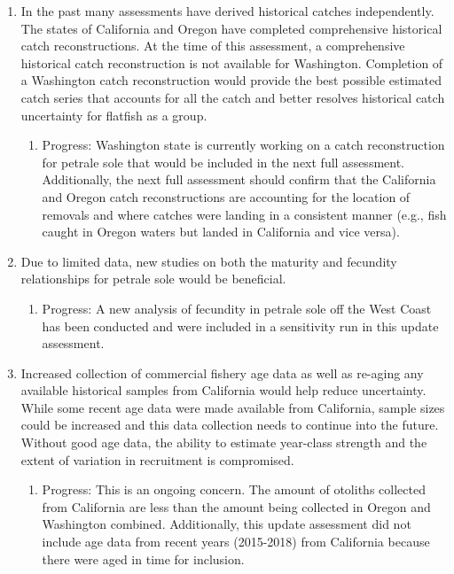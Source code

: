\documentclass[12pt,]{article}
\begin{document}
\begin{enumerate}

\item In the past many assessments have derived historical catches independently. The states of California and Oregon have completed comprehensive historical catch reconstructions. At the time of this assessment, a comprehensive historical catch reconstruction is not available for Washington. Completion of a Washington catch reconstruction would provide the best possible estimated catch series that accounts for all the catch and better resolves historical catch uncertainty for flatfish as a group.

\begin{enumerate}
\item Progress: Washington state is currently working on a catch reconstruction for petrale sole that would be included in the next full assessment.  Additionally, the next full assessment should confirm that the California and Oregon catch reconstructions are accounting for the location of removals and where catches were landing in a consistent manner (e.g., fish caught in Oregon waters but landed in California and vice versa).
\end{enumerate}

\item Due to limited data, new studies on both the maturity and fecundity relationships for petrale sole would be beneficial.

\begin{enumerate}
\item Progress: A new analysis of fecundity in petrale sole off the West Coast has been conducted and were included in a sensitivity run in this update assessment.
\end{enumerate}

\item Increased collection of commercial fishery age data as well as re-aging any available historical samples from California would help reduce uncertainty. While some recent age data were made available from California, sample sizes could be increased and this data collection needs to continue into the future. Without good age data, the ability to estimate year-class strength and the extent of variation in recruitment is compromised.

\begin{enumerate}
\item Progress: This is an ongoing concern.  The amount of otoliths collected from California are less than the amount being collected in Oregon and Washington combined.  Additionally, this update assessment did not include age data from recent years (2015-2018) from California because there were aged in time for inclusion. 
\end{enumerate}


\end{enumerate}
\end{document}
